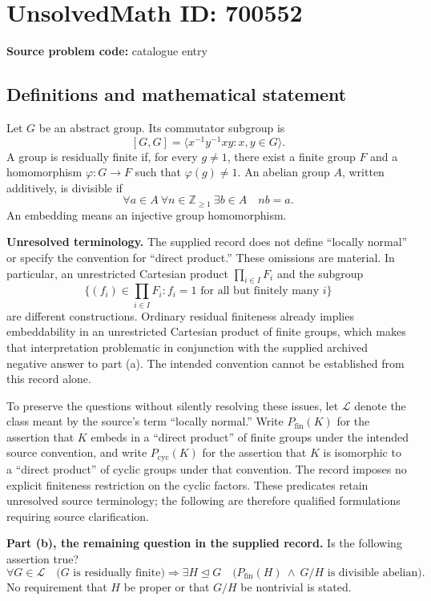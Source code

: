 \documentclass[11pt]{article}
\newcommand{\Z}{\mathbb{Z}}
\begin{document}
\section*{UnsolvedMath ID: 700552}
\textbf{Source problem code:} catalogue entry
\subsection{Definitions and mathematical statement}
Let \(G\) be an abstract group. Its commutator subgroup is
\[
[G,G]=\langle x^{-1}y^{-1}xy:x,y\in G\rangle.
\]
A group is residually finite if, for every \(g\ne 1\), there exist a finite group \(F\) and a homomorphism \(\varphi:G\to F\) such that \(\varphi(g)\ne 1\). An abelian group \(A\), written additively, is divisible if
\[
\forall a\in A\ \forall n\in\Z_{\geq 1}\ \exists b\in A\quad nb=a.
\]
An embedding means an injective group homomorphism.

\textbf{Unresolved terminology.} The supplied record does not define ``locally normal'' or specify the convention for ``direct product.'' These omissions are material. In particular, an unrestricted Cartesian product \(\prod_{i\in I}F_i\) and the subgroup
\[
\{(f_i)\in\prod_{i\in I}F_i:f_i=1\text{ for all but finitely many }i\}
\]
are different constructions. Ordinary residual finiteness already implies embeddability in an unrestricted Cartesian product of finite groups, which makes that interpretation problematic in conjunction with the supplied archived negative answer to part (a). The intended convention cannot be established from this record alone.

To preserve the questions without silently resolving these issues, let \(\mathcal L\) denote the class meant by the source's term ``locally normal.'' Write \(P_{\mathrm{fin}}(K)\) for the assertion that \(K\) embeds in a ``direct product'' of finite groups under the intended source convention, and write \(P_{\mathrm{cyc}}(K)\) for the assertion that \(K\) is isomorphic to a ``direct product'' of cyclic groups under that convention. The record imposes no explicit finiteness restriction on the cyclic factors. These predicates retain unresolved source terminology; the following are therefore qualified formulations requiring source clarification.

\textbf{Part (b), the remaining question in the supplied record.} Is the following assertion true?
\[
\forall G\in\mathcal L\quad
\bigl(G\text{ is residually finite}\bigr)
\Longrightarrow
\exists H\trianglelefteq G\quad
\bigl(P_{\mathrm{fin}}(H)\ \land\ G/H\text{ is divisible abelian}\bigr).
\]
No requirement that \(H\) be proper or that \(G/H\) be nontrivial is stated.
\end{document}
